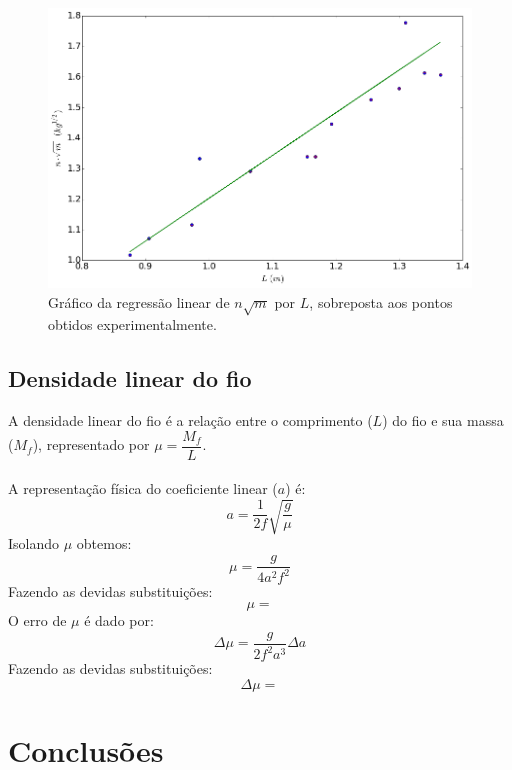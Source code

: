 \documentclass[12pt,a4paper]{article}
\begin{document}
\begin{figure} [!htbp]

\includegraphics[scale=0.6]{graf1.png}
\caption{Gráfico da regressão linear de $n\sqrt{m}$ por $L$, sobreposta aos pontos obtidos experimentalmente.}

\end{figure}
\subsection{Densidade linear do fio}
A densidade linear do fio é a relação entre o comprimento ($L$) do fio e sua massa ($M_f$), representado por $\mu = \dfrac{M_f}{L}$.\\\\
A representação física do coeficiente linear ($a$) é:
$$a = \dfrac{1}{2f} \sqrt{\dfrac{g}{\mu}}$$
Isolando $\mu$ obtemos:
$$ \mu = \dfrac{g}{4a^2f^2} $$
Fazendo as devidas substituições:
$$ \mu = $$
O erro de $\mu$ é dado por:
$$ \Delta \mu = \dfrac{g}{2f^2a^3} \Delta a $$
Fazendo as devidas substituições:
$$\Delta \mu = $$

\section{Conclusões}


\begin{thebibliography}{9}


\end{thebibliography}
\end{document}
